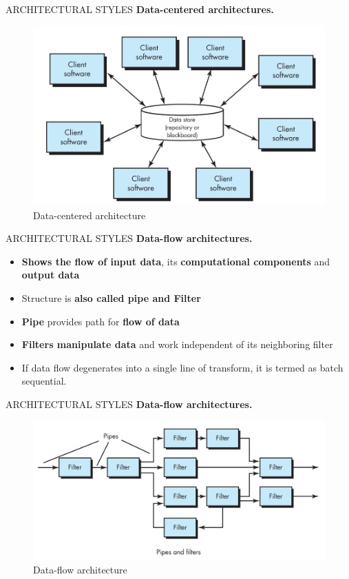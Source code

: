 \documentclass{beamer}
\begin{document}
\begin{frame}{ARCHITECTURAL STYLES}
	\textbf{Data-centered architectures. }
	\begin{figure}
		\includegraphics[scale=.45]{img/m2_36.jpg}
		\caption{Data-centered 
			architecture }
	\end{figure}
	
\end{frame}
\begin{frame}{ARCHITECTURAL STYLES}
	\textbf{Data-flow architectures.}
	\begin{itemize}
		\item \textbf{Shows the flow of input data}, its \textbf{computational components}
		and \textbf{output data}
		\item Structure is \textbf{also called pipe and Filter}
		\item \textbf{Pipe }provides path for \textbf{flow of data}
		\item \textbf{Filters manipulate data} and work independent of its
		neighboring filter
		\item If data flow degenerates into a single line of transform, it is
		termed as batch sequential.
	\end{itemize}	
\end{frame}
\begin{frame}{ARCHITECTURAL STYLES}
	\textbf{Data-flow architectures.}
	\begin{figure}
		\includegraphics[scale=.45]{img/m2_37.jpg}
		\caption{Data-flow 
			architecture }
	\end{figure}
	
\end{frame}
\end{document}
